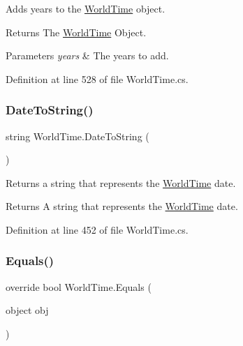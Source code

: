 Adds years to the \hyperlink{struct_world_time}{World\+Time} object. 

\begin{DoxyReturn}{Returns}
The \hyperlink{struct_world_time}{World\+Time} Object.
\end{DoxyReturn}

\begin{DoxyParams}{Parameters}
{\em years} & The years to add.\\
\hline
\end{DoxyParams}


Definition at line 528 of file World\+Time.\+cs.

\mbox{\label{struct_world_time_a5de3457e2d99193efe938c72ab9629b3}} 
\subsubsection{\texorpdfstring{Date\+To\+String()}{DateToString()}}
{\footnotesize\ttfamily string World\+Time.\+Date\+To\+String (\begin{DoxyParamCaption}{ }\end{DoxyParamCaption})}



Returns a string that represents the \hyperlink{struct_world_time}{World\+Time} date. 

\begin{DoxyReturn}{Returns}
A string that represents the \hyperlink{struct_world_time}{World\+Time} date.
\end{DoxyReturn}


Definition at line 452 of file World\+Time.\+cs.

\mbox{\label{struct_world_time_afa782ba4bacde4ebb85659550d02385c}} 
\subsubsection{\texorpdfstring{Equals()}{Equals()}}
{\footnotesize\ttfamily override bool World\+Time.\+Equals (\begin{DoxyParamCaption}\item[{object}]{obj }\end{DoxyParamCaption})}



